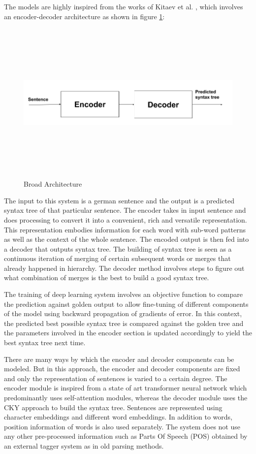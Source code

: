 \documentclass[a4paper, 11pt]{article}
\begin{document}
The models are highly inspired from the works of Kitaev et al. \parencite*{Kitaev2019}, which involves an encoder-decoder architecture as shown in figure \ref{fig:broad_architecture}:

\begin{figure}[htpb]
    \centering
    \includegraphics[width=\textwidth,height=8cm,keepaspectratio=true]
    {encoder-decoder.png}
    \caption{
        Broad Architecture
    }
    \label{fig:broad_architecture}
\end{figure}

The input to this system is a german sentence and the output is a predicted syntax tree of that particular sentence. The encoder takes in input sentence and does processing to convert it into a convenient, rich and versatile representation. This representation embodies information for each word with sub-word patterns as well as the context of the whole sentence. The encoded output is then fed into a decoder that outputs syntax tree. The building of syntax tree is seen as a continuous iteration of merging of certain subsequent words or merges that already happened in hierarchy. The decoder method involves steps to figure out what combination of merges is the best to build a good syntax tree.

The training of deep learning system involves an objective function to compare the prediction against golden output to allow fine-tuning of different components of the model using backward propagation of gradients of error. In this context, the predicted best possible syntax tree is compared against the golden tree and the parameters involved in the encoder section is updated accordingly to yield the best syntax tree next time. 

There are many ways by which the encoder and decoder components can be modeled. But in this approach, the encoder and decoder components are fixed and only the representation of sentences is varied to a certain degree. The encoder module is inspired from a state of art transformer neural network which predominantly uses self-attention modules, whereas the decoder module uses the CKY approach to build the syntax tree. Sentences are represented using character embeddings and different word embeddings. In addition to words, position information of words is also used separately. The system does not use any other pre-processed information such as Parts Of Speech (POS) obtained by an external tagger system as in old parsing methods.
\end{document}
